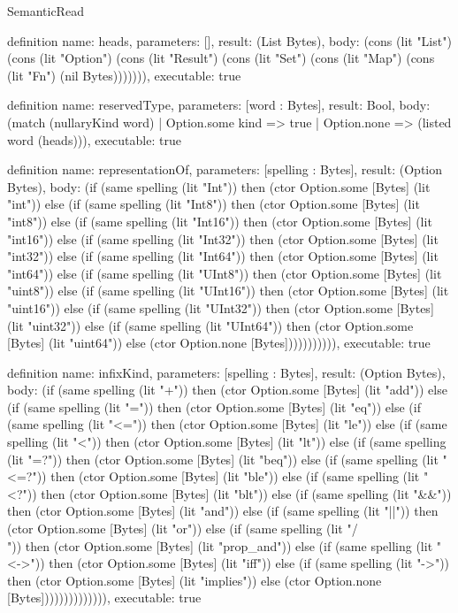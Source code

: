 \begin{lexlean}{SemanticRead}
\begin{semanticmodule}
definition{
  name: heads,
  parameters: [],
  result: (List Bytes),
  body: (cons (lit "List") (cons (lit "Option") (cons (lit "Result") (cons (lit "Set") (cons (lit "Map") (cons (lit "Fn") (nil Bytes))))))),
  executable: true
}

definition{
  name: reservedType,
  parameters: [word : Bytes],
  result: Bool,
  body: (match (nullaryKind word)
    | Option.some kind => true
    | Option.none => (listed word (heads))),
  executable: true
}

definition{
  name: representationOf,
  parameters: [spelling : Bytes],
  result: (Option Bytes),
  body: (if (same spelling (lit "Int")) then (ctor Option.some [Bytes] (lit "int")) else (if (same spelling (lit "Int8")) then (ctor Option.some [Bytes] (lit "int8")) else (if (same spelling (lit "Int16")) then (ctor Option.some [Bytes] (lit "int16")) else (if (same spelling (lit "Int32")) then (ctor Option.some [Bytes] (lit "int32")) else (if (same spelling (lit "Int64")) then (ctor Option.some [Bytes] (lit "int64")) else (if (same spelling (lit "UInt8")) then (ctor Option.some [Bytes] (lit "uint8")) else (if (same spelling (lit "UInt16")) then (ctor Option.some [Bytes] (lit "uint16")) else (if (same spelling (lit "UInt32")) then (ctor Option.some [Bytes] (lit "uint32")) else (if (same spelling (lit "UInt64")) then (ctor Option.some [Bytes] (lit "uint64")) else (ctor Option.none [Bytes])))))))))),
  executable: true
}

definition{
  name: infixKind,
  parameters: [spelling : Bytes],
  result: (Option Bytes),
  body: (if (same spelling (lit "+")) then (ctor Option.some [Bytes] (lit "add")) else (if (same spelling (lit "=")) then (ctor Option.some [Bytes] (lit "eq")) else (if (same spelling (lit "<=")) then (ctor Option.some [Bytes] (lit "le")) else (if (same spelling (lit "<")) then (ctor Option.some [Bytes] (lit "lt")) else (if (same spelling (lit "=?")) then (ctor Option.some [Bytes] (lit "beq")) else (if (same spelling (lit "<=?")) then (ctor Option.some [Bytes] (lit "ble")) else (if (same spelling (lit "<?")) then (ctor Option.some [Bytes] (lit "blt")) else (if (same spelling (lit "&&")) then (ctor Option.some [Bytes] (lit "and")) else (if (same spelling (lit "||")) then (ctor Option.some [Bytes] (lit "or")) else (if (same spelling (lit "/\\")) then (ctor Option.some [Bytes] (lit "prop_and")) else (if (same spelling (lit "<->")) then (ctor Option.some [Bytes] (lit "iff")) else (if (same spelling (lit "->")) then (ctor Option.some [Bytes] (lit "implies")) else (ctor Option.none [Bytes]))))))))))))),
  executable: true
}


\end{semanticmodule}
\end{lexlean}
